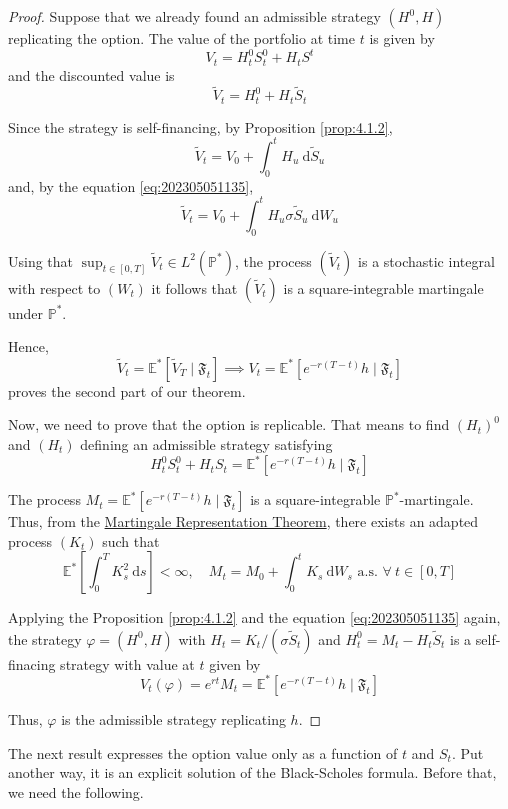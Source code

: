 \begin{proof}
    Suppose that we already found an admissible strategy $(H^0, H)$ replicating the option. The value of the portfolio at time $t$ is given by 
    \[
        V_t = H_t^0 S_t^0 + H_t S^t 
    \]
    and the discounted value is 
    \[
        \tilde{V}_t = H_t^0 + H_t \tilde{S}_t
    \]

    Since the strategy is self-financing, by Proposition \ref{prop:4.1.2},
    \[
        \tilde{V}_t = V_0 + \int_0^t H_u ~\mathrm{d}\tilde{S}_u
    \]
    and, by the equation \eqref{eq:202305051135}, 
    \[
        \tilde{V}_t = V_0 + \int_0^t H_u \sigma \tilde{S}_u ~\mathrm{d}W_u
    \]

    Using that $\sup_{t \in [0, T]} \tilde{V}_t \in L^2(\mathbb{P}^\ast)$, the process $(\tilde{V}_t)$ is a stochastic integral with respect to $(W_t)$ it follows that $(\tilde{V}_t)$ is a square-integrable martingale under $\mathbb{P}^\ast$.

    Hence, 
    \[
        \tilde{V}_t = \mathbb{E}^\ast [\tilde{V}_T \mid \mathfrak{F}_t] \implies V_t = \mathbb{E}^\ast [e^{-r(T-t)} h \mid \mathfrak{F}_t]
    \]
    proves the second part of our theorem. 

    Now, we need to prove that the option is replicable. That means to find $(H_t)^0$ and $(H_t)$ defining an admissible strategy satisfying 
    \[
        H_t^0 S_t^0 + H_t S_t = \mathbb{E}^\ast [e^{-r(T-t)} h \mid \mathfrak{F}_t]
    \]
    
    The process $M_t = \mathbb{E}^\ast [e^{-r(T-t)} h \mid \mathfrak{F}_t]$ is a square-integrable $\mathbb{P}^\ast$-martingale. Thus, from the \hyperref[thm:martingale_representation]{Martingale Representation Theorem}, there exists an adapted process $(K_t)$ such that 
    \[
        \mathbb{E}^\ast \left[ \int_0^T K_s^2 ~\mathrm{d}s \right] < \infty, \quad M_t = M_0 + \int_0^t K_s ~\mathrm{d}W_s \text{ a.s. } \forall~t \in [0, T]
    \]

    Applying the Proposition \ref{prop:4.1.2} and the equation \eqref{eq:202305051135} again, the strategy $\varphi = (H^0, H)$ with $H_t = K_t/(\sigma \tilde{S}_t)$ and $H_t^0 = M_t - H_t \tilde{S}_t$ is a self-finacing strategy with value at $t$ given by 
    \[
        V_t(\varphi) = e^{rt} M_t = \mathbb{E}^\ast [e^{-r(T-t)} h \mid \mathfrak{F}_t]
    \]

    Thus, $\varphi$ is the admissible strategy replicating $h$.
\end{proof}

The next result expresses the option value only as a function of $t$ and $S_t$. Put another way, it is an explicit solution of the Black-Scholes formula. Before that, we need the following. 


